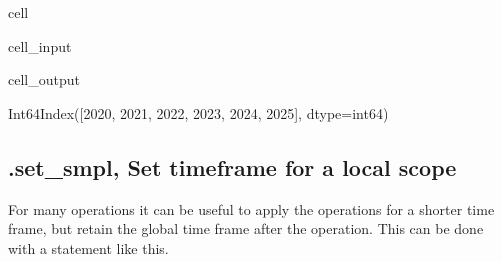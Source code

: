 \documentclass[letterpaper,10pt,english]{jupyterBook}
\begin{document}
\begin{sphinxuseclass}{cell}\begin{sphinxVerbatimInput}

\begin{sphinxuseclass}{cell_input}
\begin{sphinxVerbatim}[commandchars=\\\{\}]
\end{sphinxVerbatim}

\end{sphinxuseclass}\end{sphinxVerbatimInput}
\begin{sphinxVerbatimOutput}

\begin{sphinxuseclass}{cell_output}
\begin{sphinxVerbatim}[commandchars=\\\{\}]
Int64Index([2020, 2021, 2022, 2023, 2024, 2025], dtype=\PYGZsq{}int64\PYGZsq{})
\end{sphinxVerbatim}

\end{sphinxuseclass}\end{sphinxVerbatimOutput}

\end{sphinxuseclass}

\subsection{.set\_smpl, Set timeframe for a local scope}
\label{\detokenize{content/notebooks/modelflow_features:set-smpl-set-timeframe-for-a-local-scope}}
\sphinxAtStartPar
For many operations it can be useful to apply the operations for a shorter time frame, but retain the global time frame after the operation. 
This can be done  with a  statement like this.
\end{document}
